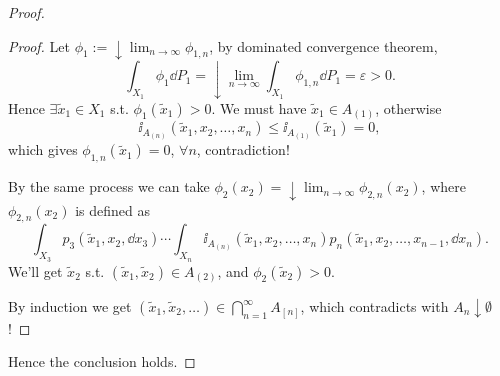 \begin{proof}[Proof]
\begin{proof}[Proof]
		Let $\phi_1 := \downarrow \lim_{n\to \infty}\phi_{1, n}$, by dominated
		convergence theorem,
		\[
		\int_{X_1}\phi_1\dd P_1 = \downarrow \lim_{n\to \infty}\int_{X_1}\phi_{1, n}
		\dd P_1 = \varepsilon > 0.
		\]
		Hence $\exists \tilde x_1\in X_1$ s.t. $\phi_1(\tilde x_1) > 0$.
		We must have $\tilde x_1\in A_{(1)}$, otherwise
		\[
		\ii_{A_{(n)}}(\tilde x_1, x_2,\dots, x_n) \le \ii_{A_{(1)}}(\tilde x_1) = 0,
		\]
		which gives $\phi_{1, n}(\tilde x_1) = 0$, $\forall n$, contradiction!

		By the same process we can take $\phi_2(x_2) = \downarrow \lim_{n\to \infty}
		\phi_{2, n}(x_2)$, where $\phi_{2, n}(x_2)$ is defined as
		\[
		\int_{X_3}p_3(\tilde x_1, x_2, \dd x_3)\cdots \int_{X_n}\ii_{A_{(n)}}
		(\tilde x_1, x_2, \dots, x_n) p_n(\tilde x_1, x_2,\dots, x_{n-1}, \dd x_n).
		\]
		We'll get $\tilde x_2$ s.t. $(\tilde x_1, \tilde x_2)\in A_{(2)}$,
		and $\phi_2(\tilde x_2)>0$.

		By induction we get $(\tilde x_1, \tilde x_2, \dots)\in
		\bigcap_{n=1}^\infty A_{[n]}$,
		which contradicts with $A_n\downarrow \emptyset$!
	\end{proof}
	Hence the conclusion holds.
\end{proof}
